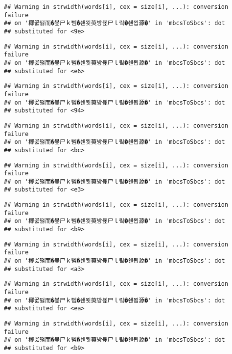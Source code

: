 \documentclass[]{article}
\begin{document}
\begin{verbatim}
## Warning in strwidth(words[i], cex = size[i], ...): conversion failure
## on '椰꾨떯而�뵾尸ｋ뻼�쇈묏萸방뵾尸ｌ맄�쇈묍源�' in 'mbcsToSbcs': dot
## substituted for <9e>
\end{verbatim}

\begin{verbatim}
## Warning in strwidth(words[i], cex = size[i], ...): conversion failure
## on '椰꾨떯而�뵾尸ｋ뻼�쇈묏萸방뵾尸ｌ맄�쇈묍源�' in 'mbcsToSbcs': dot
## substituted for <e6>
\end{verbatim}

\begin{verbatim}
## Warning in strwidth(words[i], cex = size[i], ...): conversion failure
## on '椰꾨떯而�뵾尸ｋ뻼�쇈묏萸방뵾尸ｌ맄�쇈묍源�' in 'mbcsToSbcs': dot
## substituted for <94>
\end{verbatim}

\begin{verbatim}
## Warning in strwidth(words[i], cex = size[i], ...): conversion failure
## on '椰꾨떯而�뵾尸ｋ뻼�쇈묏萸방뵾尸ｌ맄�쇈묍源�' in 'mbcsToSbcs': dot
## substituted for <bc>
\end{verbatim}

\begin{verbatim}
## Warning in strwidth(words[i], cex = size[i], ...): conversion failure
## on '椰꾨떯而�뵾尸ｋ뻼�쇈묏萸방뵾尸ｌ맄�쇈묍源�' in 'mbcsToSbcs': dot
## substituted for <e3>
\end{verbatim}

\begin{verbatim}
## Warning in strwidth(words[i], cex = size[i], ...): conversion failure
## on '椰꾨떯而�뵾尸ｋ뻼�쇈묏萸방뵾尸ｌ맄�쇈묍源�' in 'mbcsToSbcs': dot
## substituted for <b9>
\end{verbatim}

\begin{verbatim}
## Warning in strwidth(words[i], cex = size[i], ...): conversion failure
## on '椰꾨떯而�뵾尸ｋ뻼�쇈묏萸방뵾尸ｌ맄�쇈묍源�' in 'mbcsToSbcs': dot
## substituted for <a3>
\end{verbatim}

\begin{verbatim}
## Warning in strwidth(words[i], cex = size[i], ...): conversion failure
## on '椰꾨떯而�뵾尸ｋ뻼�쇈묏萸방뵾尸ｌ맄�쇈묍源�' in 'mbcsToSbcs': dot
## substituted for <ea>
\end{verbatim}

\begin{verbatim}
## Warning in strwidth(words[i], cex = size[i], ...): conversion failure
## on '椰꾨떯而�뵾尸ｋ뻼�쇈묏萸방뵾尸ｌ맄�쇈묍源�' in 'mbcsToSbcs': dot
## substituted for <b9>
\end{verbatim}
\end{document}
